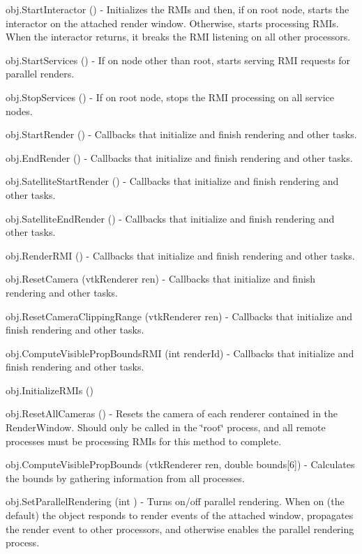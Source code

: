 \begin{DoxyItemize}
\item {\ttfamily obj.\-Start\-Interactor ()} -\/ Initializes the R\-M\-Is and then, if on root node, starts the interactor on the attached render window. Otherwise, starts processing R\-M\-Is. When the interactor returns, it breaks the R\-M\-I listening on all other processors.  
\item {\ttfamily obj.\-Start\-Services ()} -\/ If on node other than root, starts serving R\-M\-I requests for parallel renders.  
\item {\ttfamily obj.\-Stop\-Services ()} -\/ If on root node, stops the R\-M\-I processing on all service nodes.  
\item {\ttfamily obj.\-Start\-Render ()} -\/ Callbacks that initialize and finish rendering and other tasks.  
\item {\ttfamily obj.\-End\-Render ()} -\/ Callbacks that initialize and finish rendering and other tasks.  
\item {\ttfamily obj.\-Satellite\-Start\-Render ()} -\/ Callbacks that initialize and finish rendering and other tasks.  
\item {\ttfamily obj.\-Satellite\-End\-Render ()} -\/ Callbacks that initialize and finish rendering and other tasks.  
\item {\ttfamily obj.\-Render\-R\-M\-I ()} -\/ Callbacks that initialize and finish rendering and other tasks.  
\item {\ttfamily obj.\-Reset\-Camera (vtk\-Renderer ren)} -\/ Callbacks that initialize and finish rendering and other tasks.  
\item {\ttfamily obj.\-Reset\-Camera\-Clipping\-Range (vtk\-Renderer ren)} -\/ Callbacks that initialize and finish rendering and other tasks.  
\item {\ttfamily obj.\-Compute\-Visible\-Prop\-Bounds\-R\-M\-I (int render\-Id)} -\/ Callbacks that initialize and finish rendering and other tasks.  
\item {\ttfamily obj.\-Initialize\-R\-M\-Is ()}  
\item {\ttfamily obj.\-Reset\-All\-Cameras ()} -\/ Resets the camera of each renderer contained in the Render\-Window. Should only be called in the \char`\"{}root\char`\"{} process, and all remote processes must be processing R\-M\-Is for this method to complete.  
\item {\ttfamily obj.\-Compute\-Visible\-Prop\-Bounds (vtk\-Renderer ren, double bounds\mbox{[}6\mbox{]})} -\/ Calculates the bounds by gathering information from all processes.  
\item {\ttfamily obj.\-Set\-Parallel\-Rendering (int )} -\/ Turns on/off parallel rendering. When on (the default) the object responds to render events of the attached window, propagates the render event to other processors, and otherwise enables the parallel rendering process.  

\end{DoxyItemize}
